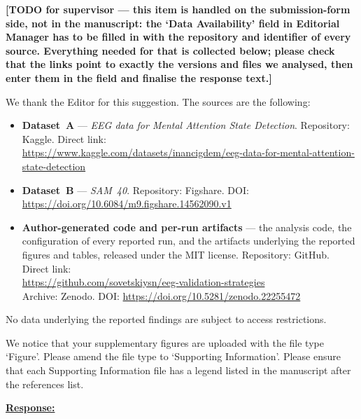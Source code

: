 \documentclass{article}
\begin{document}
\textbf{[TODO for supervisor --- this item is handled on the submission-form
side, not in the manuscript: the `Data Availability' field in Editorial Manager
has to be filled in with the repository and identifier of every source. Everything
needed for that is collected below; please check that the links point to exactly
the versions and files we analysed, then enter them in the field and finalise
the response text.]}

\vspace{0.2cm}

We thank the Editor for this suggestion. The sources are the following:

\begin{itemize}
	\item \textbf{Dataset~A} --- \emph{EEG data for Mental Attention State
	      Detection}. Repository: Kaggle. Direct link:\\
	      \url{https://www.kaggle.com/datasets/inancigdem/eeg-data-for-mental-attention-state-detection}
	\item \textbf{Dataset~B} --- \emph{SAM~40}. Repository: Figshare. DOI:\\
	      \url{https://doi.org/10.6084/m9.figshare.14562090.v1}
	\item \textbf{Author-generated code and per-run artifacts} --- the analysis
	      code, the configuration of every reported run, and the artifacts
	      underlying the reported figures and tables, released under the MIT
	      license. Repository: GitHub. Direct link:\\
	      \url{https://github.com/sovetskiysn/eeg-validation-strategies}\\
	      Archive: Zenodo. DOI: \url{https://doi.org/10.5281/zenodo.22255472}
\end{itemize}

\noindent
No data underlying the reported findings are subject to access restrictions.

\vspace{0.3cm}


\begin{cmt}{}{}

We notice that your supplementary figures are uploaded with the file type
`Figure'. Please amend the file type to `Supporting Information'. Please ensure
that each Supporting Information file has a legend listed in the manuscript
after the references list.

\end{cmt}
\vspace{0.1cm}
\noindent
\underline{\textbf{Response:}}
\vspace{0.2cm}
\end{document}
